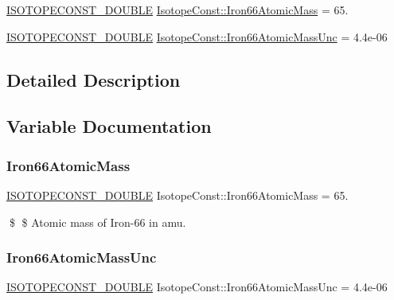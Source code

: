 \begin{DoxyCompactItemize}
\item 
\mbox{\hyperlink{group___isotope_const-_macros_ga8f45a7272ce02c0b4c65c44636ed719a}{I\+S\+O\+T\+O\+P\+E\+C\+O\+N\+S\+T\+\_\+\+D\+O\+U\+B\+LE}} \mbox{\hyperlink{group___isotope_const-_iron-_fe66_ga73b718cce2d829d19c33f6fca6a9a057}{Isotope\+Const\+::\+Iron66\+Atomic\+Mass}} = 65.
\item 
\mbox{\hyperlink{group___isotope_const-_macros_ga8f45a7272ce02c0b4c65c44636ed719a}{I\+S\+O\+T\+O\+P\+E\+C\+O\+N\+S\+T\+\_\+\+D\+O\+U\+B\+LE}} \mbox{\hyperlink{group___isotope_const-_iron-_fe66_ga7764e5cc4757e69757406ed61d1de395}{Isotope\+Const\+::\+Iron66\+Atomic\+Mass\+Unc}} = 4.\+4e-\/06
\end{DoxyCompactItemize}


\subsection{Detailed Description}


\subsection{Variable Documentation}
\mbox{\label{group___isotope_const-_iron-_fe66_ga73b718cce2d829d19c33f6fca6a9a057}} 
\subsubsection{\texorpdfstring{Iron66\+Atomic\+Mass}{Iron66AtomicMass}}
{\footnotesize\ttfamily \mbox{\hyperlink{group___isotope_const-_macros_ga8f45a7272ce02c0b4c65c44636ed719a}{I\+S\+O\+T\+O\+P\+E\+C\+O\+N\+S\+T\+\_\+\+D\+O\+U\+B\+LE}} Isotope\+Const\+::\+Iron66\+Atomic\+Mass = 65.}

\$ \$ Atomic mass of Iron-\/66 in amu. \mbox{\label{group___isotope_const-_iron-_fe66_ga7764e5cc4757e69757406ed61d1de395}} 
\subsubsection{\texorpdfstring{Iron66\+Atomic\+Mass\+Unc}{Iron66AtomicMassUnc}}
{\footnotesize\ttfamily \mbox{\hyperlink{group___isotope_const-_macros_ga8f45a7272ce02c0b4c65c44636ed719a}{I\+S\+O\+T\+O\+P\+E\+C\+O\+N\+S\+T\+\_\+\+D\+O\+U\+B\+LE}} Isotope\+Const\+::\+Iron66\+Atomic\+Mass\+Unc = 4.\+4e-\/06}

